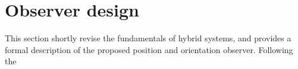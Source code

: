 \section{Observer design}
\label{obsdes}


This section shortly revise the fundamentals of hybrid systems, and provides a formal description of the proposed position and orientation observer. Following the

